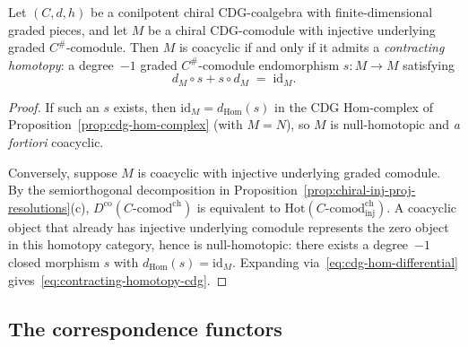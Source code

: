 \begin{corollary}
\label{cor:coacyclic-injective-contractible}
Let $(C, d, h)$ be a conilpotent chiral CDG-coalgebra with
finite-dimensional graded pieces, and let $M$ be a chiral
CDG-comodule with injective underlying graded $C^{\#}$-comodule.
Then $M$ is coacyclic if and only if it admits a
\emph{contracting homotopy}: a degree~$-1$ graded
$C^{\#}$-comodule endomorphism $s \colon M \to M$ satisfying
\begin{equation}\label{eq:contracting-homotopy-cdg}
d_M \circ s + s \circ d_M \;=\; \mathrm{id}_M.
\end{equation}
\end{corollary}

\begin{proof}
If such an $s$ exists, then $\mathrm{id}_M = d_{\mathrm{Hom}}(s)$
in the CDG Hom-complex of
Proposition~\ref{prop:cdg-hom-complex} (with $M = N$), so $M$ is
null-homotopic and \emph{a fortiori} coacyclic.

Conversely, suppose $M$ is coacyclic with injective underlying
graded comodule.  By the semiorthogonal decomposition in
Proposition~\ref{prop:chiral-inj-proj-resolutions}(c),
$D^{\mathrm{co}}(C\text{-}\mathrm{comod}^{\mathrm{ch}})$
is equivalent to
$\mathrm{Hot}(C\text{-}\mathrm{comod}^{\mathrm{ch}}_{\mathrm{inj}})$.
A coacyclic object that already has injective underlying comodule
represents the zero object in this homotopy category, hence is
null-homotopic: there exists a degree~$-1$ closed morphism
$s$ with $d_{\mathrm{Hom}}(s) = \mathrm{id}_M$.
Expanding via~\eqref{eq:cdg-hom-differential} gives~\eqref{eq:contracting-homotopy-cdg}.
\end{proof}

\subsection{The correspondence functors}
\label{subsec:chiral-correspondence-functors}

